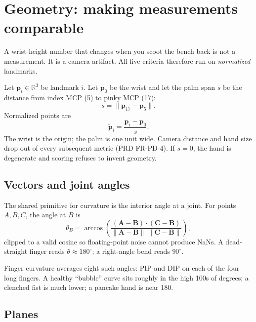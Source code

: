 \documentclass[11pt,a4paper]{article}
\begin{document}
\section{Geometry: making measurements comparable}
\label{sec:geometry}

A wrist-height number that changes when you scoot the bench back is not a measurement.
It is a camera artifact.
All five criteria therefore run on \emph{normalized} landmarks.

Let \(\mathbf{p}_i \in \mathbb{R}^3\) be landmark \(i\).
Let \(\mathbf{p}_0\) be the wrist and let the palm span \(s\) be the distance from index MCP (5) to pinky MCP (17):
\begin{equation}
  s = \lVert \mathbf{p}_{17} - \mathbf{p}_{5} \rVert.
\end{equation}
Normalized points are
\begin{equation}
  \tilde{\mathbf{p}}_i = \frac{\mathbf{p}_i - \mathbf{p}_0}{s}.
\end{equation}
The wrist is the origin; the palm is one unit wide.
Camera distance and hand size drop out of every subsequent metric (PRD FR-PD-4).
If \(s=0\), the hand is degenerate and scoring refuses to invent geometry.

\subsection{Vectors and joint angles}

The shared primitive for curvature is the interior angle at a joint.
For points \(A,B,C\), the angle at \(B\) is
\begin{equation}
  \theta_B = \arccos\left(
    \frac{(\mathbf{A}-\mathbf{B})\cdot(\mathbf{C}-\mathbf{B})}
         {\lVert\mathbf{A}-\mathbf{B}\rVert\,\lVert\mathbf{C}-\mathbf{B}\rVert}
  \right),
\end{equation}
clipped to a valid cosine so floating-point noise cannot produce NaNs.
A dead-straight finger reads \(\theta \approx 180^\circ\); a right-angle bend reads \(90^\circ\).

Finger curvature averages eight such angles: PIP and DIP on each of the four long fingers.
A healthy \enquote{bubble} curve sits roughly in the high 100s of degrees; a clenched fist is much lower; a pancake hand is near 180.

\subsection{Planes}
\end{document}
